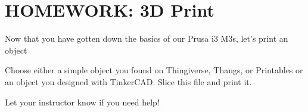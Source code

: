 
\section{HOMEWORK: 3D Print}

Now that you have gotten down the basics of our Prusa i3 M3s, let's print an object

\begin{exercise}
Choose either a simple object you found on Thingiverse, Thangs, or Printables or an object you designed with TinkerCAD. Slice this file and print it.
\end{exercise}

\begin{remark}
Let your instructor know if you need help!
\end{remark}


